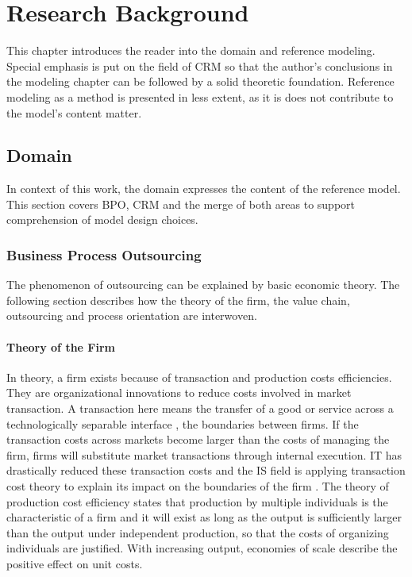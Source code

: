 
\chapter{Research Background}
	This chapter introduces the reader into the domain and reference modeling. Special emphasis is put on the field of \acrshort{CRM} so that the author's conclusions in the modeling chapter can be followed by a solid theoretic foundation. Reference modeling as a method is presented in less extent, as it is does not contribute to the model's content matter.
	
	\section{Domain}
	In context of this work, the domain expresses the content of the reference model. This section covers \acrshort{BPO}, \acrshort{CRM} and the merge of both areas to support comprehension of model design choices.
		\subsection{Business Process Outsourcing}
		The phenomenon of outsourcing can be explained by basic economic theory. The following section describes how the theory of the firm, the value chain, outsourcing and process orientation are interwoven. 
		
		
		\subsubsection{Theory of the Firm}
		In theory, a firm exists because of transaction and production costs efficiencies. They are organizational innovations to reduce costs involved in market transaction. A transaction here means the transfer of a good or service across a technologically separable interface \citep{williamson1981economics, williamson1971vertical}, \eg the boundaries between firms. If the transaction costs across markets become larger than the costs of managing the firm, firms will substitute market transactions through internal execution. IT has drastically reduced these transaction costs and the IS field is applying transaction cost theory to explain its impact on the boundaries of the firm \citep{aron2005just}.
		The theory of production cost efficiency states that production by multiple individuals is the characteristic of a firm \citep{alchian1972production} and it will exist as long as the output is sufficiently larger than the output under independent production, so that the costs of organizing individuals are justified. With increasing output, economies of scale describe the positive effect on unit costs. 
		
